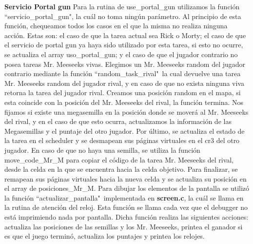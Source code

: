 \documentclass[a4paper]{article}
\begin{document}
\justify
\textbf{Servicio Portal gun}
\justify
Para la rutina de use_portal_gun utilizamos la función ``servicio_portal_gun", la cuál no toma ningún parámetro. Al principio de esta función, chequeamos todos los casos en el que la misma no realiza ninguna acción. Estas son: el caso de que la tarea actual sea Rick o Morty; el caso de que el servicio de portal gun ya haya sido utilizado por esta tarea, si esto no ocurre, se actualiza el array uso_portal_gun; y el caso de que el jugador contrario no posea tareas Mr. Meeseeks vivas. Elegimos un Mr. Meeseeks random del jugador contrario mediante la función ``random_task_rival"\, la cual devuelve una tarea Mr. Meeseeks random del jugador rival, y en caso de que no exista ninguna viva retorna la tarea del jugador rival. Creamos una posición random en el mapa, si esta coincide con la posición del Mr. Meeseeks del rival, la función termina. Nos fijamos si existe una megasemilla en la posición donde se moverá al Mr. Meeseeks del rival, y en el caso de que esto ocurra, actualizamos la información de las Megasemillas y el puntaje del otro jugador. Por último, se actualiza el estado de la tarea en el scheduler y se desmapean sus páginas virtuales en el cr3 del otro jugador. En caso de que no haya una semilla, se utiliza la función move_code_Mr_M para copiar el código de la tarea Mr. Meeseeks del rival, desde la celda en la que se encuentra hacia la celda objetivo. Para finalizar, se remapean sus páginas virtuales hacia la nueva celda y se actualiza su posición en el array de posiciones_Mr_M.
\justify
Para dibujar los elementos de la pantalla se utilizó la función ``actualizar_pantalla"\ implementada en \textbf{screen.c}, la cuál se llama en la rutina de atención del reloj. Esta función se llama cada vez que el debugger no está imprimiendo nada por pantalla. Dicha función realiza las siguientes acciones: actualiza las posiciones de las semillas y los Mr. Meeseeks, printea el ganador si es que el juego terminó, actualiza los puntajes y printea los relojes.
\end{document}
